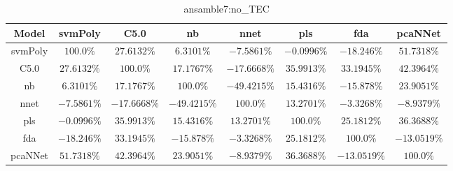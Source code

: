 \begin{table}[!ht]
	\centering
	\begin{tabular}{|c|c|c|c|c|c|c|c|}
		\hline
		Model & svmPoly & C5.0 & nb & nnet & pls & fda & pcaNNet \\ \hline
		svmPoly & $100.0\%$ & $27.6132\%$ & $6.3101\%$ & $-7.5861\%$ & $-0.0996\%$ & $-18.246\%$ & $51.7318\%$ \\ \hline
		C5.0 & $27.6132\%$ & $100.0\%$ & $17.1767\%$ & $-17.6668\%$ & $35.9913\%$ & $33.1945\%$ & $42.3964\%$ \\ \hline
		nb & $6.3101\%$ & $17.1767\%$ & $100.0\%$ & $-49.4215\%$ & $15.4316\%$ & $-15.878\%$ & $23.9051\%$ \\ \hline
		nnet & $-7.5861\%$ & $-17.6668\%$ & $-49.4215\%$ & $100.0\%$ & $13.2701\%$ & $-3.3268\%$ & $-8.9379\%$ \\ \hline
		pls & $-0.0996\%$ & $35.9913\%$ & $15.4316\%$ & $13.2701\%$ & $100.0\%$ & $25.1812\%$ & $36.3688\%$ \\ \hline
		fda & $-18.246\%$ & $33.1945\%$ & $-15.878\%$ & $-3.3268\%$ & $25.1812\%$ & $100.0\%$ & $-13.0519\%$ \\ \hline
		pcaNNet & $51.7318\%$ & $42.3964\%$ & $23.9051\%$ & $-8.9379\%$ & $36.3688\%$ & $-13.0519\%$ & $100.0\%$ \\ \hline
	\end{tabular}
	\caption{ansamble7:no_TEC}
	\label{tab:ansamble7:no_TEC}
\end{table}
